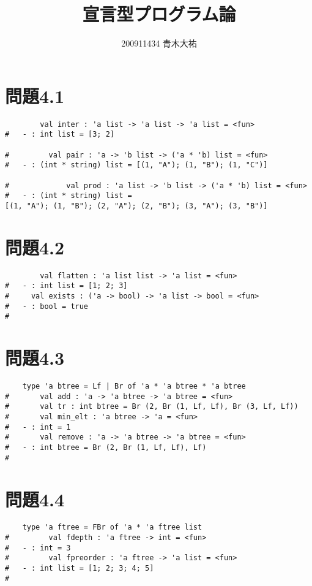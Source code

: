 \documentclass[a4paper,12pt]{jarticle}
\title{宣言型プログラム論}
\author{200911434 青木大祐}
\begin{document}
\maketitle
\newpage

\section*{問題4.1}

\begin{lstlisting}
        val inter : 'a list -> 'a list -> 'a list = <fun>
#   - : int list = [3; 2]

#         val pair : 'a -> 'b list -> ('a * 'b) list = <fun>
#   - : (int * string) list = [(1, "A"); (1, "B"); (1, "C")]

#             val prod : 'a list -> 'b list -> ('a * 'b) list = <fun>
#   - : (int * string) list =
[(1, "A"); (1, "B"); (2, "A"); (2, "B"); (3, "A"); (3, "B")]
\end{lstlisting}

\section*{問題4.2}

\begin{lstlisting}
        val flatten : 'a list list -> 'a list = <fun>
#   - : int list = [1; 2; 3]
#     val exists : ('a -> bool) -> 'a list -> bool = <fun>
#   - : bool = true
# 
\end{lstlisting}
\newpage
\section*{問題4.3}

\begin{lstlisting}
    type 'a btree = Lf | Br of 'a * 'a btree * 'a btree
#       val add : 'a -> 'a btree -> 'a btree = <fun>
#       val tr : int btree = Br (2, Br (1, Lf, Lf), Br (3, Lf, Lf))
#       val min_elt : 'a btree -> 'a = <fun>
#   - : int = 1
#       val remove : 'a -> 'a btree -> 'a btree = <fun>
#   - : int btree = Br (2, Br (1, Lf, Lf), Lf)
# 
\end{lstlisting}
\newpage
\section*{問題4.4}

\begin{lstlisting}
    type 'a ftree = FBr of 'a * 'a ftree list
#         val fdepth : 'a ftree -> int = <fun>
#   - : int = 3
#         val fpreorder : 'a ftree -> 'a list = <fun>
#   - : int list = [1; 2; 3; 4; 5]
# 
\end{lstlisting}
\end{document}
